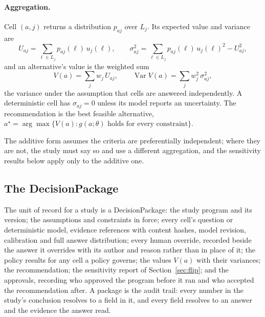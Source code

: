 \paragraph{Aggregation.}
Cell $(a, j)$ returns a distribution $p_{aj}$ over $L_j$. Its expected value
and variance are
\begin{equation}
  U_{aj} = \sum_{\ell \in L_j} p_{aj}(\ell)\, u_j(\ell), \qquad
  \sigma^2_{aj} = \sum_{\ell \in L_j} p_{aj}(\ell)\, u_j(\ell)^2 - U_{aj}^2,
\end{equation}
and an alternative's value is the weighted sum
\begin{equation}
  V(a) = \sum_{j} w_j\, U_{aj}, \qquad
  \operatorname{Var} V(a) = \sum_j w_j^2\, \sigma^2_{aj},
  \label{eq:value}
\end{equation}
the variance under the assumption that cells are answered independently. A
deterministic cell has $\sigma_{aj} = 0$ unless its model reports an
uncertainty. The recommendation is the best feasible alternative,
$a^\star = \arg\max \{V(a) : g(a; \theta) \text{ holds for every constraint}\}$.

The additive form assumes the criteria are preferentially independent; where
they are not, the study must say so and use a different aggregation, and the
sensitivity results below apply only to the additive one.

\subsection{The DecisionPackage}

The unit of record for a study is a DecisionPackage: the study program and its
version; the assumptions and constraints in force; every cell's question or
deterministic model, evidence references with content hashes, model
revision, calibration and full answer distribution; every human override,
recorded beside the answer it overrides with its author and reason rather than
in place of it; the policy results for any cell a policy governs; the values
$V(a)$ with their variances; the recommendation; the sensitivity report of
Section~\ref{sec:flip}; and the approvals, recording who approved the program
before it ran and who accepted the recommendation after. A package is the audit trail: every number in the
study's conclusion resolves to a field in it, and every field resolves to an
answer and the evidence the answer read.

